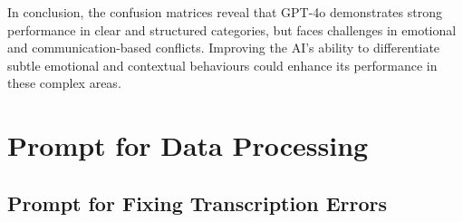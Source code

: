 In conclusion, the confusion matrices reveal that GPT-4o demonstrates strong performance in clear and structured categories, but faces challenges in emotional and communication-based conflicts. Improving the AI’s ability to differentiate subtle emotional and contextual behaviours could enhance its performance in these complex areas.







\section{Prompt for Data Processing}

\subsection{Prompt for Fixing Transcription Errors}
\label{app:prompt_transcription}

